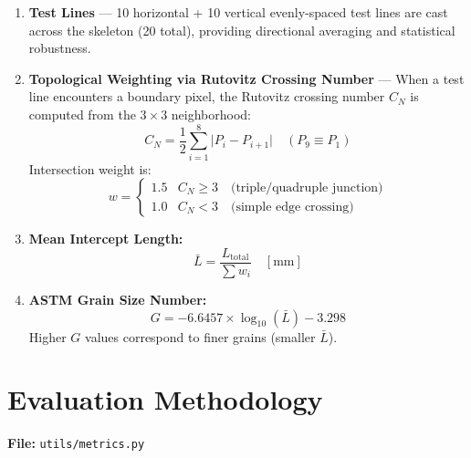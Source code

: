 \documentclass[12pt,a4paper]{article}
\newcommand{\file}[1]{\texttt{\small #1}}
\begin{document}
\begin{enumerate}[leftmargin=*]
    \item \textbf{Test Lines} --- 10 horizontal + 10 vertical evenly-spaced
          test lines are cast across the skeleton (20 total), providing
          directional averaging and statistical robustness.

    \item \textbf{Topological Weighting via Rutovitz Crossing Number} ---
          When a test line encounters a boundary pixel, the Rutovitz
          crossing number $C_N$ is computed from the $3\times3$ neighborhood:
          \begin{equation}
              C_N = \frac{1}{2}\sum_{i=1}^{8}\bigl|P_i - P_{i+1}\bigr|
              \quad (P_9 \equiv P_1)
          \end{equation}
          Intersection weight is:
          \begin{equation}
              w = \begin{cases}
                  1.5 & C_N \geq 3 \quad \text{(triple/quadruple junction)} \\
                  1.0 & C_N < 3 \quad \text{(simple edge crossing)}
              \end{cases}
          \end{equation}

    \item \textbf{Mean Intercept Length:}
          \begin{equation}
              \bar{L} = \frac{L_\mathrm{total}}{\sum w_i}
              \quad [\text{mm}]
          \end{equation}

    \item \textbf{ASTM Grain Size Number:}
          \begin{equation}
              \boxed{G = -6.6457 \times \log_{10}(\bar{L}) - 3.298}
          \end{equation}
          Higher $G$ values correspond to finer grains (smaller $\bar{L}$).
\end{enumerate}


\section{Evaluation Methodology}

\textbf{File:} \file{utils/metrics.py}
\end{document}
